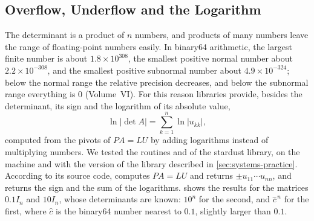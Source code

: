 \subsection{Overflow, Underflow and the Logarithm}
\label{sec:det-overflow}

The determinant is a product of $n$ numbers, and products of many numbers leave the range of floating-point numbers easily. In binary64 arithmetic, the largest finite number is about $1.8\times10^{308}$, the smallest positive normal number about $2.2\times10^{-308}$, and the smallest positive subnormal number about $4.9\times10^{-324}$; below the normal range the relative precision decreases, and below the subnormal range everything is $0$ (Volume~VI). For this reason libraries provide, besides the determinant, its sign and the logarithm of its absolute value,
\[
\ln|\det A|=\sum_{k=1}^n\ln|u_{kk}|,
\]
computed from the pivots of $PA=LU$ by adding logarithms instead of multiplying numbers. We tested the routines  and  of the stardust library, on the machine and with the version of the library described in \cref{sec:systems-practice}. According to its source code,  computes $PA=LU$ and returns $\pm u_{11}\cdots u_{nn}$, and  returns the sign and the sum of the logarithms.  shows the results for the matrices $0.1I_n$ and $10I_n$, whose determinants are known: $10^n$ for the second, and $\hat c^{\,n}$ for the first, where $\hat c$ is the binary64 number nearest to $0.1$, slightly larger than $0.1$.

